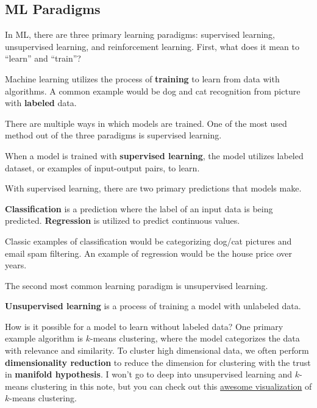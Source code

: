 \documentclass[../../main.tex]{subfiles}
\begin{document}
\subsection{ML Paradigms}

In ML, there are three primary learning paradigms: supervised
learning, unsupervised learning, and reinforcement learning.
First, what does it mean to ``learn'' and ``train''?

\begin{definition}{}{}
Machine learning utilizes the process of \textbf{training} to
learn from data with algorithms. A common example would be
dog and cat recognition from picture with \textbf{labeled} data.
\end{definition}

There are multiple ways in which models are trained. One of the
most used method out of the three paradigms is supervised learning.

\begin{definition}{}{}
When a model is trained with \textbf{supervised learning},
the model utilizes labeled dataset, or examples of input-output
pairs, to learn.
\end{definition}

With supervised learning, there are two primary predictions that
models make.

\begin{definition}{}{}
\textbf{Classification} is a prediction where the label of an
input data is being predicted. \textbf{Regression} is utilized
to predict continuous values.
\end{definition}

Classic examples of classification would be categorizing dog/cat
pictures and email spam filtering. An example of regression would
be the house price over years.

The second most common learning paradigm is unsupervised learning.

\begin{definition}{}{}
\textbf{Unsupervised learning} is a process of training a model
with unlabeled data.
\end{definition}

How is it possible for a model to learn without labeled data?
One primary example algorithm is $k$-means clustering,
where the model categorizes the data with relevance and similarity.
To cluster high dimensional data, we often perform
\textbf{dimensionality reduction} to reduce the dimension for
clustering with the trust in \textbf{manifold hypothesis}.
I won't go to deep into unsupervised learning and $k$-means clustering
in this note, but you can check out this
\href{https://www.naftaliharris.com/blog/visualizing-k-means-clustering/}
{awesome visualization} of $k$-means clustering.
\end{document}
